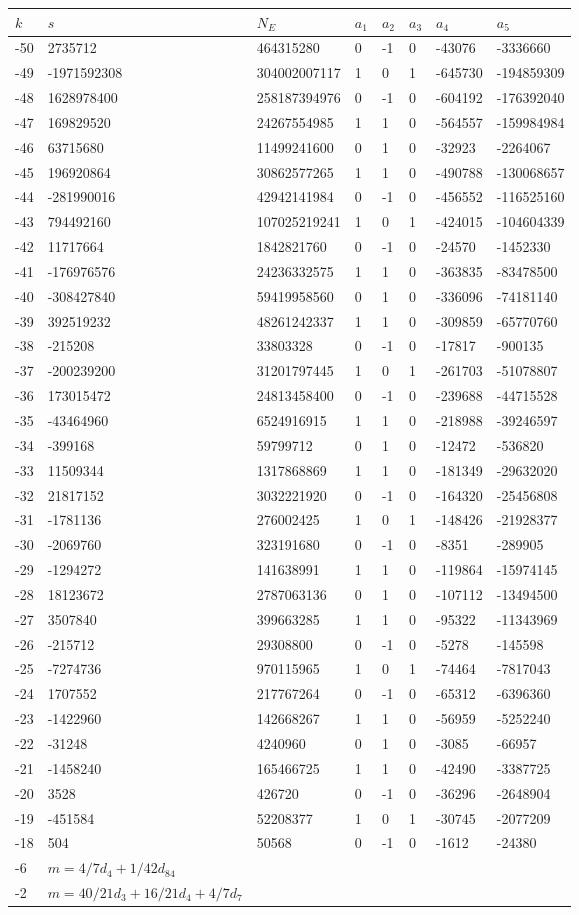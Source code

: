 \documentclass{amsart}
\begin{document}
\begin{longtable}{|l|l|l|lllll|}
\hline
$k$ & $s$ & $N_E$ & $a_1$ & $a_2$ & $a_3$ & $a_4$ & $a_5$\\
\hline
-50&2735712&464315280&0&-1&0&-43076&-3336660\\
-49&-1971592308&304002007117&1&0&1&-645730&-194859309\\
-48&1628978400&258187394976&0&-1&0&-604192&-176392040\\
-47&169829520&24267554985&1&1&0&-564557&-159984984\\
-46&63715680&11499241600&0&1&0&-32923&-2264067\\
-45&196920864&30862577265&1&1&0&-490788&-130068657\\
-44&-281990016&42942141984&0&-1&0&-456552&-116525160\\
-43&794492160&107025219241&1&0&1&-424015&-104604339\\
-42&11717664&1842821760&0&-1&0&-24570&-1452330\\
-41&-176976576&24236332575&1&1&0&-363835&-83478500\\
-40&-308427840&59419958560&0&1&0&-336096&-74181140\\
-39&392519232&48261242337&1&1&0&-309859&-65770760\\
-38&-215208&33803328&0&-1&0&-17817&-900135\\
-37&-200239200&31201797445&1&0&1&-261703&-51078807\\
-36&173015472&24813458400&0&-1&0&-239688&-44715528\\
-35&-43464960&6524916915&1&1&0&-218988&-39246597\\
-34&-399168&59799712&0&1&0&-12472&-536820\\
-33&11509344&1317868869&1&1&0&-181349&-29632020\\
-32&21817152&3032221920&0&-1&0&-164320&-25456808\\
-31&-1781136&276002425&1&0&1&-148426&-21928377\\
-30&-2069760&323191680&0&-1&0&-8351&-289905\\
-29&-1294272&141638991&1&1&0&-119864&-15974145\\
-28&18123672&2787063136&0&1&0&-107112&-13494500\\
-27&3507840&399663285&1&1&0&-95322&-11343969\\
-26&-215712&29308800&0&-1&0&-5278&-145598\\
-25&-7274736&970115965&1&0&1&-74464&-7817043\\
-24&1707552&217767264&0&-1&0&-65312&-6396360\\
-23&-1422960&142668267&1&1&0&-56959&-5252240\\
-22&-31248&4240960&0&1&0&-3085&-66957\\
-21&-1458240&165466725&1&1&0&-42490&-3387725\\
-20&3528&426720&0&-1&0&-36296&-2648904\\
-19&-451584&52208377&1&0&1&-30745&-2077209\\
-18&504&50568&0&-1&0&-1612&-24380\\
-6&$m=4/7d_{4}+1/42d_{84}$&&\multicolumn{5}{c|}{}\\
-2&$m=40/21d_{3}+16/21d_{4}+4/7d_{7}$&&\multicolumn{5}{c|}{}\\
\hline
\end{longtable}
\end{document}
